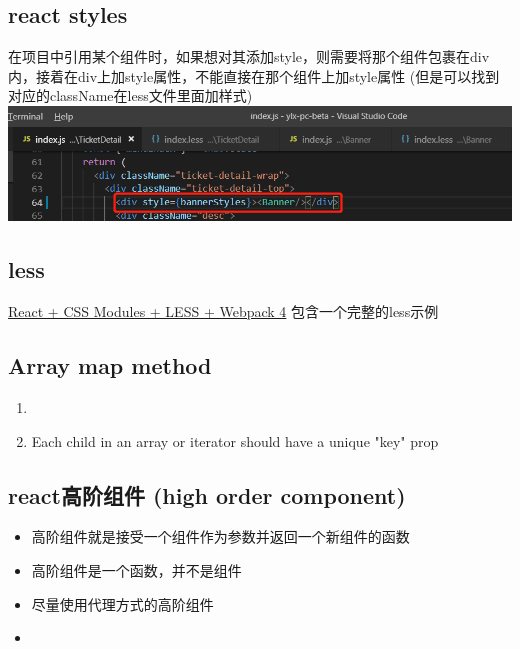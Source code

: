 \documentclass[a4paper, 12pt]{article}
\begin{document}
\subsection{react styles}
在项目中引用某个组件时，如果想对其添加style，则需要将那个组件包裹在div内，接着在div上加style属性，不能直接在那个组件上加style属性 (但是可以找到对应的className在less文件里面加样式)\\
\includegraphics{./pics/styleOnComponent.png}


\subsection{less}
\href{https://medium.com/@joseph0crick/react-css-modules-less-webpack-4-a50d902d0a3}{React + CSS Modules + LESS + Webpack 4}
包含一个完整的less示例

\subsection{Array map method}
\begin{enumerate}
\item 

\item Each child in an array or iterator should have a unique "key" prop

\end{enumerate}

\subsection{react高阶组件 (high order component)}
\begin{itemize}
\item 高阶组件就是接受一个组件作为参数并返回一个新组件的函数

\item 高阶组件是一个函数，并不是组件

\item 尽量使用代理方式的高阶组件

\item 

\end{itemize}
\end{document}
